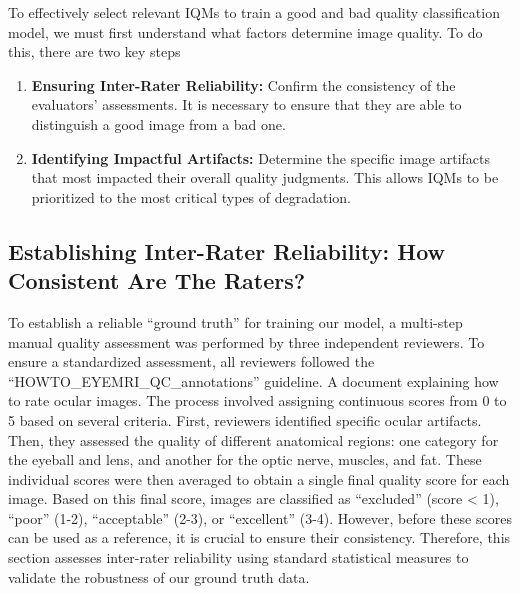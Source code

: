 To effectively select relevant IQMs to train a good and bad quality classification model, we must first understand what factors determine image quality. To do this, there are two key steps
\begin{enumerate}
    \item \textbf{Ensuring Inter-Rater Reliability:} Confirm the consistency of the evaluators' assessments. It is necessary to ensure that they are able to distinguish a good image from a bad one.
    \item \textbf{Identifying Impactful Artifacts:} Determine the specific image artifacts that most impacted their overall quality judgments. This allows IQMs to be prioritized to the most critical types of degradation.
\end{enumerate}

\subsection{Establishing Inter-Rater Reliability: How Consistent Are The Raters?}
\label{sec:inter_rater_reliability}

To establish a reliable “ground truth” for training our model, a multi-step manual quality assessment was performed by three independent reviewers. To ensure a standardized assessment, all reviewers followed the “HOWTO\_EYEMRI\_QC\_annotations” guideline. A document explaining how to rate ocular images. The process involved assigning continuous scores from 0 to 5 based on several criteria. First, reviewers identified specific ocular artifacts. Then, they assessed the quality of different anatomical regions: one category for the eyeball and lens, and another for the optic nerve, muscles, and fat. These individual scores were then averaged to obtain a single final quality score for each image. Based on this final score, images are classified as “excluded” (score < 1), “poor” (1-2), “acceptable” (2-3), or “excellent” (3-4). However, before these scores can be used as a reference, it is crucial to ensure their consistency. Therefore, this section assesses inter-rater reliability using standard statistical measures to validate the robustness of our ground truth data.


